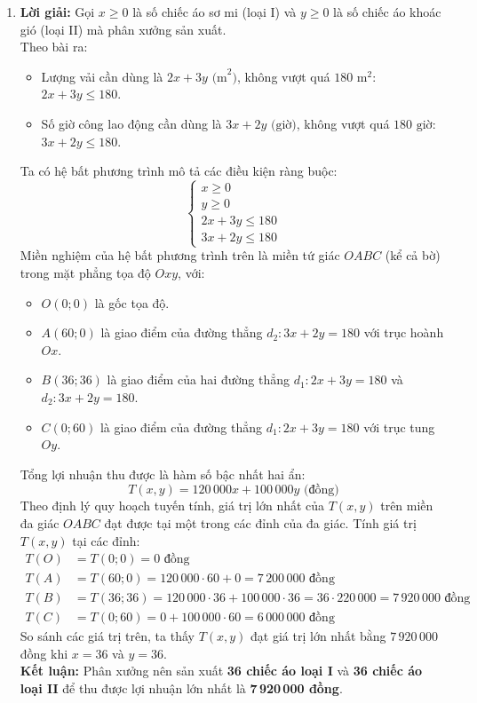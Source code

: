 \documentclass[12pt,a4paper]{article}
\begin{document}
\begin{enumerate}[resume]
\item \textbf{Lời giải:}
Gọi $x \ge 0$ là số chiếc áo sơ mi (loại I) và $y \ge 0$ là số chiếc áo khoác gió (loại II) mà phân xưởng sản xuất.\\
Theo bài ra:
\begin{itemize}
    \item Lượng vải cần dùng là $2x + 3y\text{ (m}^2\text{)}$, không vượt quá $180\text{ m}^2$: $2x + 3y \le 180$.
    \item Số giờ công lao động cần dùng là $3x + 2y\text{ (giờ)}$, không vượt quá $180\text{ giờ}$: $3x + 2y \le 180$.
\end{itemize}
Ta có hệ bất phương trình mô tả các điều kiện ràng buộc:
\[ \begin{cases} x \ge 0 \\ y \ge 0 \\ 2x + 3y \le 180 \\ 3x + 2y \le 180 \end{cases} \]
Miền nghiệm của hệ bất phương trình trên là miền tứ giác $OABC$ (kể cả bờ) trong mặt phẳng tọa độ $Oxy$, với:
\begin{itemize}
    \item $O(0; 0)$ là gốc tọa độ.
    \item $A(60; 0)$ là giao điểm của đường thẳng $d_2: 3x + 2y = 180$ với trục hoành $Ox$.
    \item $B(36; 36)$ là giao điểm của hai đường thẳng $d_1: 2x + 3y = 180$ và $d_2: 3x + 2y = 180$.
    \item $C(0; 60)$ là giao điểm của đường thẳng $d_1: 2x + 3y = 180$ với trục tung $Oy$.
\end{itemize}
Tổng lợi nhuận thu được là hàm số bậc nhất hai ẩn:
\[ T(x, y) = 120\,000x + 100\,000y\text{ (đồng)} \]
Theo định lý quy hoạch tuyến tính, giá trị lớn nhất của $T(x, y)$ trên miền đa giác $OABC$ đạt được tại một trong các đỉnh của đa giác. Tính giá trị $T(x, y)$ tại các đỉnh:
\begin{align*}
    T(O) &= T(0; 0) = 0\text{ đồng}\\
    T(A) &= T(60; 0) = 120\,000 \cdot 60 + 0 = 7\,200\,000\text{ đồng}\\
    T(B) &= T(36; 36) = 120\,000 \cdot 36 + 100\,000 \cdot 36 = 36 \cdot 220\,000 = 7\,920\,000\text{ đồng}\\
    T(C) &= T(0; 60) = 0 + 100\,000 \cdot 60 = 6\,000\,000\text{ đồng}
\end{align*}
So sánh các giá trị trên, ta thấy $T(x, y)$ đạt giá trị lớn nhất bằng $7\,920\,000$ đồng khi $x = 36$ và $y = 36$.\\
\textbf{Kết luận:} Phân xưởng nên sản xuất \textbf{36 chiếc áo loại I} và \textbf{36 chiếc áo loại II} để thu được lợi nhuận lớn nhất là \textbf{7\,920\,000 đồng}.
\end{enumerate}
\end{document}
